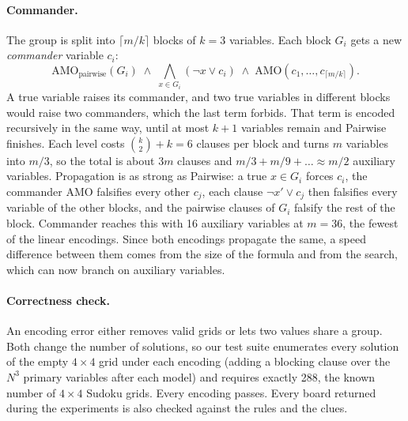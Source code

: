 \paragraph{Commander.} The group is split into $\lceil m/k\rceil$ blocks of $k=3$ variables. Each block $G_i$ gets a new \emph{commander} variable $c_i$:
\begin{equation}\label{eq:commander}
\mathrm{AMO}_{\mathrm{pairwise}}(G_i) \;\wedge\; \bigwedge_{x\in G_i}(\neg x\vee c_i) \;\wedge\; \mathrm{AMO}(c_1,\dots,c_{\lceil m/k\rceil}).
\end{equation}
A true variable raises its commander, and two true variables in different blocks would raise two commanders, which the last term forbids. That term is encoded recursively in the same way, until at most $k+1$ variables remain and Pairwise finishes. Each level costs $\binom{k}{2}+k=6$ clauses per block and turns $m$ variables into $m/3$, so the total is about $3m$ clauses and $m/3+m/9+\dots\approx m/2$ auxiliary variables. Propagation is as strong as Pairwise: a true $x\in G_i$ forces $c_i$, the commander AMO falsifies every other $c_j$, each clause $\neg x'\vee c_j$ then falsifies every variable of the other blocks, and the pairwise clauses of $G_i$ falsify the rest of the block. Commander reaches this with 16 auxiliary variables at $m=36$, the fewest of the linear encodings. Since both encodings propagate the same, a speed difference between them comes from the size of the formula and from the search, which can now branch on auxiliary variables.

\paragraph{Correctness check.} An encoding error either removes valid grids or lets two values share a group. Both change the number of solutions, so our test suite enumerates every solution of the empty $4\times4$ grid under each encoding (adding a blocking clause over the $N^3$ primary variables after each model) and requires exactly 288, the known number of $4\times4$ Sudoku grids. Every encoding passes. Every board returned during the experiments is also checked against the rules and the clues.
